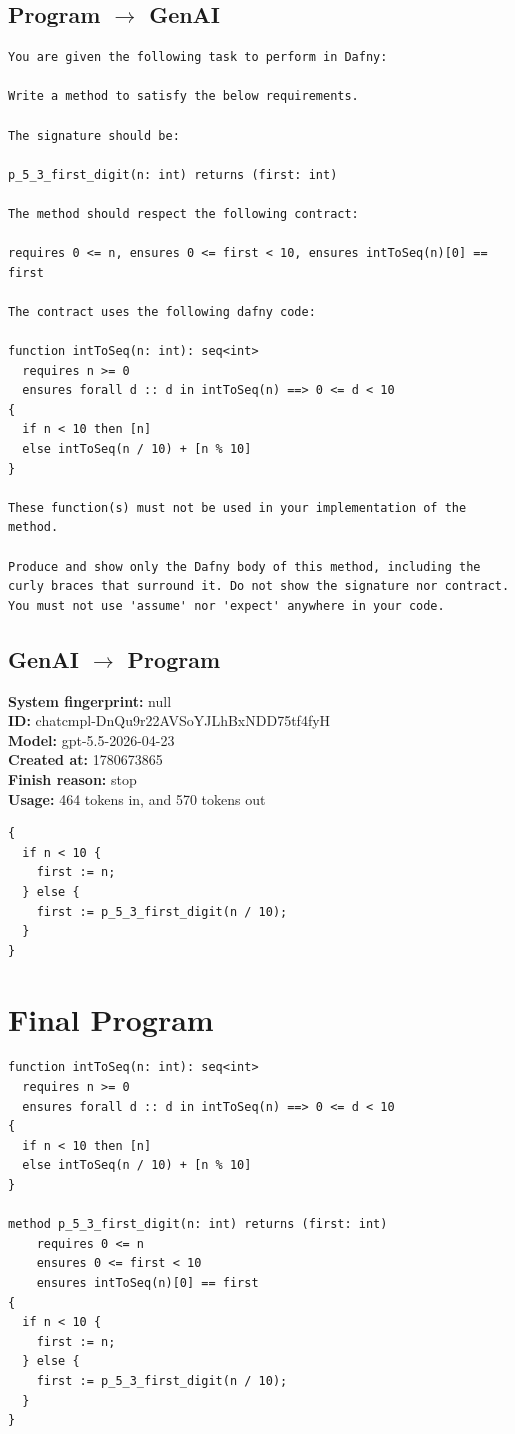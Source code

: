 \documentclass{article}
\begin{document}
\subsection*{Program $\rightarrow$ GenAI}
\begin{lstlisting}
You are given the following task to perform in Dafny:

Write a method to satisfy the below requirements.

The signature should be:

p_5_3_first_digit(n: int) returns (first: int)

The method should respect the following contract:

requires 0 <= n, ensures 0 <= first < 10, ensures intToSeq(n)[0] == first

The contract uses the following dafny code:

function intToSeq(n: int): seq<int>
  requires n >= 0
  ensures forall d :: d in intToSeq(n) ==> 0 <= d < 10
{
  if n < 10 then [n]
  else intToSeq(n / 10) + [n % 10]
}

These function(s) must not be used in your implementation of the method.

Produce and show only the Dafny body of this method, including the curly braces that surround it. Do not show the signature nor contract. You must not use 'assume' nor 'expect' anywhere in your code.
\end{lstlisting}
\subsection*{GenAI $\rightarrow$ Program}
\textbf{System fingerprint: }null
\\\textbf{ID: }chatcmpl-DnQu9r22AVSoYJLhBxNDD75tf4fyH
\\\textbf{Model: }gpt-5.5-2026-04-23
\\\textbf{Created at: }1780673865
\\\textbf{Finish reason: }stop
\\\textbf{Usage: }464 tokens in, and 570 tokens out
\begin{lstlisting}
{
  if n < 10 {
    first := n;
  } else {
    first := p_5_3_first_digit(n / 10);
  }
}
\end{lstlisting}
\section*{Final Program}
\begin{lstlisting}
function intToSeq(n: int): seq<int>
  requires n >= 0
  ensures forall d :: d in intToSeq(n) ==> 0 <= d < 10
{
  if n < 10 then [n]
  else intToSeq(n / 10) + [n % 10]
}

method p_5_3_first_digit(n: int) returns (first: int)
	requires 0 <= n
	ensures 0 <= first < 10
	ensures intToSeq(n)[0] == first
{
  if n < 10 {
    first := n;
  } else {
    first := p_5_3_first_digit(n / 10);
  }
}
\end{lstlisting}
\end{document}
